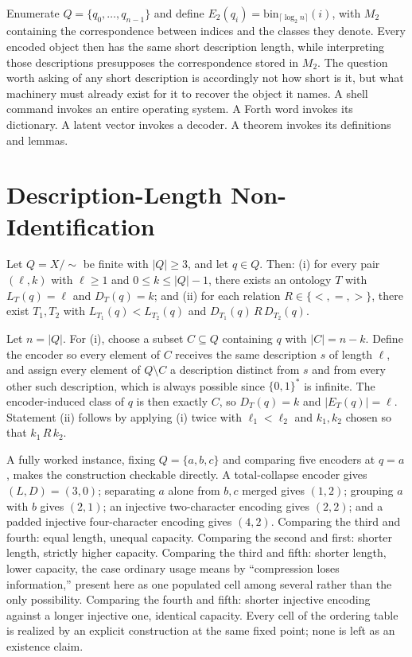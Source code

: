 Enumerate $Q = \{q_0,\ldots,q_{n-1}\}$ and define $E_2(q_i) = \mathrm{bin}_{\lceil \log_2 n \rceil}(i)$, with $M_2$ containing the correspondence between indices and the classes they denote. Every encoded object then has the same short description length, while interpreting those descriptions presupposes the correspondence stored in $M_2$. The question worth asking of any short description is accordingly not how short is it, but what machinery must already exist for it to recover the object it names. A shell command invokes an entire operating system. A Forth word invokes its dictionary. A latent vector invokes a decoder. A theorem invokes its definitions and lemmas.

\section{Description-Length Non-Identification}

\begin{proposition}
\label{prop:nonident}
Let $Q = X/\!\sim$ be finite with $|Q| \geq 3$, and let $q \in Q$. Then: (i) for every pair $(\ell,k)$ with $\ell \geq 1$ and $0 \leq k \leq |Q|-1$, there exists an ontology $T$ with $L_T(q) = \ell$ and $D_T(q) = k$; and (ii) for each relation $R \in \{<,=,>\}$, there exist $T_1, T_2$ with $L_{T_1}(q) < L_{T_2}(q)$ and $D_{T_1}(q)\, R\, D_{T_2}(q)$.
\end{proposition}

Let $n = |Q|$. For (i), choose a subset $C \subseteq Q$ containing $q$ with $|C| = n-k$. Define the encoder so every element of $C$ receives the same description $s$ of length $\ell$, and assign every element of $Q \setminus C$ a description distinct from $s$ and from every other such description, which is always possible since $\{0,1\}^\ast$ is infinite. The encoder-induced class of $q$ is then exactly $C$, so $D_T(q) = k$ and $|E_T(q)| = \ell$. Statement (ii) follows by applying (i) twice with $\ell_1 < \ell_2$ and $k_1, k_2$ chosen so that $k_1\, R\, k_2$.

A fully worked instance, fixing $Q = \{a,b,c\}$ and comparing five encoders at $q=a$, makes the construction checkable directly. A total-collapse encoder gives $(L,D) = (3,0)$; separating $a$ alone from $b,c$ merged gives $(1,2)$; grouping $a$ with $b$ gives $(2,1)$; an injective two-character encoding gives $(2,2)$; and a padded injective four-character encoding gives $(4,2)$. Comparing the third and fourth: equal length, unequal capacity. Comparing the second and first: shorter length, strictly higher capacity. Comparing the third and fifth: shorter length, lower capacity, the case ordinary usage means by ``compression loses information,'' present here as one populated cell among several rather than the only possibility. Comparing the fourth and fifth: shorter injective encoding against a longer injective one, identical capacity. Every cell of the ordering table is realized by an explicit construction at the same fixed point; none is left as an existence claim.

